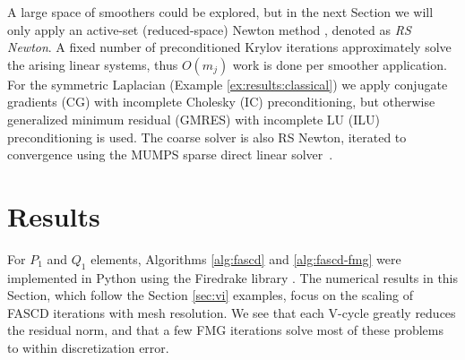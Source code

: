 \documentclass[review,hidelinks,onefignum,onetabnum]{siamart220329}
\begin{document}
A large space of smoothers could be explored, but in the next Section we will only apply an active-set (reduced-space) Newton method \cite{Balayetal2023,BensonMunson2006}, denoted as \emph{RS Newton}.  A fixed number of preconditioned Krylov iterations approximately solve the arising linear systems, thus $O(m_j)$ work is done per smoother application.  For the symmetric Laplacian (Example \ref{ex:results:classical}) we apply conjugate gradients (CG) with incomplete Cholesky (IC) preconditioning, but otherwise generalized minimum residual (GMRES) with incomplete LU (ILU) preconditioning is used.  The coarse solver is also RS Newton, iterated to convergence using the MUMPS sparse direct linear solver~\cite{Amestoy2001}.


\section{Results} \label{sec:results}

For $P_1$ and $Q_1$ elements, Algorithms \ref{alg:fascd} and \ref{alg:fascd-fmg} were implemented in Python using the Firedrake library \cite{Rathgeberetal2016}.  The numerical results in this Section, which follow the Section \ref{sec:vi} examples, focus on the scaling of FASCD iterations with mesh resolution.  We see that each V-cycle greatly reduces the residual norm, and that a few FMG iterations solve most of these problems to within discretization error.
\end{document}
